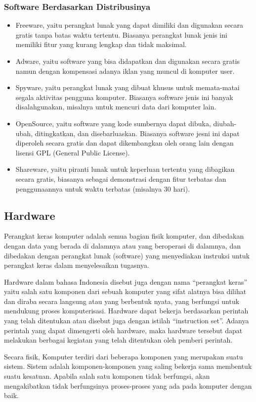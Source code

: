 \subsubsection{Software Berdasarkan Distribusinya}

\begin{itemize}
\item Freeware, yaitu perangkat lunak yang dapat dimiliki dan digunakan secara gratis tanpa batas waktu tertentu. Biasanya perangkat lunak jenis ini memiliki fitur yang kurang lengkap dan tidak maksimal.

\item Adware, yaitu software yang bisa didapatkan dan digunakan secara gratis namun dengan kompensasi adanya iklan yang muncul di komputer user.

\item Spyware, yaitu perangkat lunak yang dibuat khusus untuk memata-matai segala aktivitas pengguna komputer. Biasanya software jenis ini banyak disalahgunakan, misalnya untuk mencuri data dari komputer lain.

\item OpenSource, yaitu software yang kode sumbernya dapat dibuka, diubah-ubah, ditingkatkan, dan disebarluaskan. Biasanya software jesni ini dapat diperoleh secara gratis dan dapat dikembangkan oleh orang lain dengan lisensi GPL (General Public License).

\item Shareware, yaitu piranti lunak untuk keperluan tertentu yang dibagikan secara gratis, biasanya sebagai demonstrasi dengan fitur terbatas dan penggunaannya untuk waktu terbatas (misalnya 30 hari).

\end{itemize}

\subsection{Hardware}

Perangkat keras komputer adalah semua bagian fisik komputer, dan dibedakan dengan data yang berada di dalamnya atau yang beroperasi di dalamnya, dan dibedakan dengan perangkat lunak (software) yang menyediakan instruksi untuk perangkat keras dalam menyelesaikan tugasnya.

Hardware dalam bahasa Indonesia disebut juga dengan nama “perangkat keras” yaitu salah satu komponen dari sebuah komputer yang sifat alatnya bisa dilihat dan diraba secara langsung atau yang berbentuk nyata, yang berfungsi untuk mendukung proses komputerisasi. Hardware dapat bekerja berdasarkan perintah yang telah ditentukan atau disebut juga dengan istilah “instruction set”. Adanya perintah yang dapat dimengerti oleh hardware, maka hardware tersebut dapat melakukan berbagai kegiatan yang telah ditentukan oleh pemberi perintah.

Secara fisik, Komputer terdiri dari beberapa komponen yang merupakan suatu sistem. Sistem adalah komponen-komponen yang saling bekerja sama membentuk suatu kesatuan. Apabila salah satu komponen tidak berfungsi, akan mengakibatkan tidak berfungsinya proses-proses yang ada pada komputer dengan  baik.